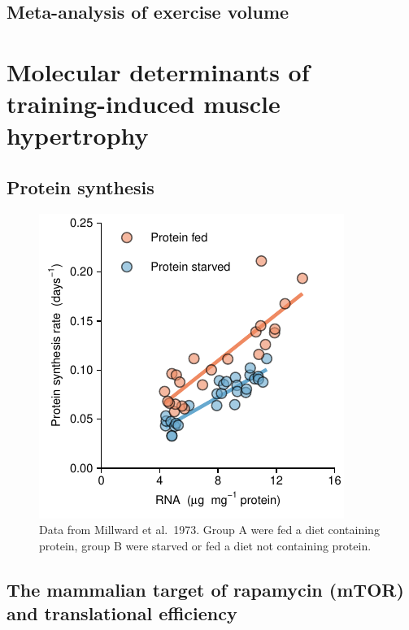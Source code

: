 \documentclass[twoside,10pt]{gihclass} %
\begin{document}
\hypertarget{meta-analysis-of-exercise-volume}{%
\subsection{Meta-analysis of exercise volume}\label{meta-analysis-of-exercise-volume}}

\hypertarget{molecular-determinants-of-training-induced-muscle-hypertrophy}{%
\section{Molecular determinants of training-induced muscle hypertrophy}\label{molecular-determinants-of-training-induced-muscle-hypertrophy}}

\hypertarget{protein-synthesis}{%
\subsection{Protein synthesis}\label{protein-synthesis}}
\begin{figure}
\centering
\includegraphics{thesis_files/figure-latex/Millward1973-1.pdf}
\caption{\label{fig:Millward1973}Data from Millward et al.~1973. Group A were fed a diet containing protein, group B were starved or fed a diet not containing protein.}
\end{figure}
\hypertarget{the-mammalian-target-of-rapamycin-mtor-and-translational-efficiency}{%
\subsection{The mammalian target of rapamycin (mTOR) and translational efficiency}\label{the-mammalian-target-of-rapamycin-mtor-and-translational-efficiency}}
\end{document}
